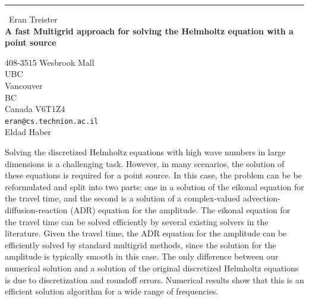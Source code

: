\documentclass{report}
\begin{document}
\begin{center}
\rule{6in}{1pt} \
{\large Eran Treister \\
{\bf A fast Multigrid approach for solving the Helmholtz equation with a point source}}

408-3515 Wesbrook Mall \\ UBC \\ Vancouver \\ BC \\ Canada V6T1Z4
\\
{\tt eran@cs.technion.ac.il}\\
Eldad Haber\end{center}

Solving the discretized Helmholtz equations with high wave numbers in
large dimensions is a challenging task. However, in many scenarios, the
solution of these equations is required for a point source. In this case,
the problem can be be reformulated and split into two parts: one in a
solution of the eikonal equation for the travel time, and the second is a
solution of a complex-valued advection-diffusion-reaction (ADR) equation
for the amplitude. The eikonal equation for the travel time can be solved
efficiently by several existing solvers in the literature. Given the
travel time, the ADR equation for the amplitude can be efficiently solved
by standard multigrid methods, since the solution for the amplitude is
typically smooth in this case. The only difference between our numerical
solution and a solution of the original discretized Helmholtz equations
is due to discretization and roundoff errors. Numerical results show that
this is an efficient solution algorithm for a wide range of frequencies.
\end{document}
